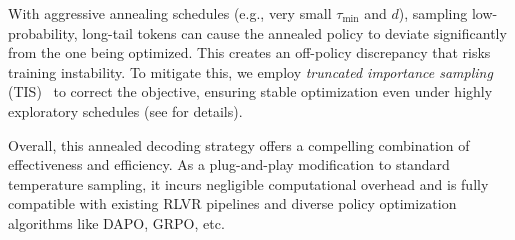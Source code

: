 With aggressive annealing schedules (e.g., very small $\tau_\mathrm{min}$ and $d$), sampling low-probability, long-tail tokens can cause the annealed policy to deviate significantly from the one being optimized. This creates an off-policy discrepancy that risks training instability.  To mitigate this, we employ \emph{truncated importance sampling} (TIS)~\citep{heckman1998matching, hilton2022batch, yao2025offpolicy} to correct the objective, ensuring stable optimization even under highly exploratory schedules (see  for details).


%
Overall, this annealed decoding strategy offers a compelling combination of effectiveness and efficiency. As a plug-and-play modification to standard temperature sampling, it incurs negligible computational overhead and is fully compatible with existing RLVR pipelines and diverse policy optimization algorithms like DAPO, GRPO, etc.

